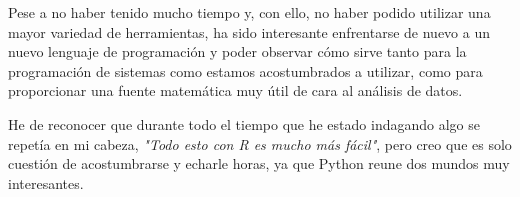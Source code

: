 \documentclass[a4,11pt]{article}
\begin{document}
Pese a no haber tenido mucho tiempo y, con ello, no haber podido utilizar una mayor variedad de herramientas, ha sido interesante enfrentarse de nuevo a un nuevo lenguaje de programación y poder observar cómo sirve tanto para la programación de sistemas como estamos acostumbrados a utilizar, como para proporcionar una fuente matemática muy útil de cara al análisis de datos.

He de reconocer que durante todo el tiempo que he estado indagando algo se repetía en mi cabeza, \emph{"Todo esto con R es mucho más fácil"}, pero creo que es solo cuestión de acostumbrarse y echarle horas, ya que Python reune dos mundos muy interesantes.



\end{document}
